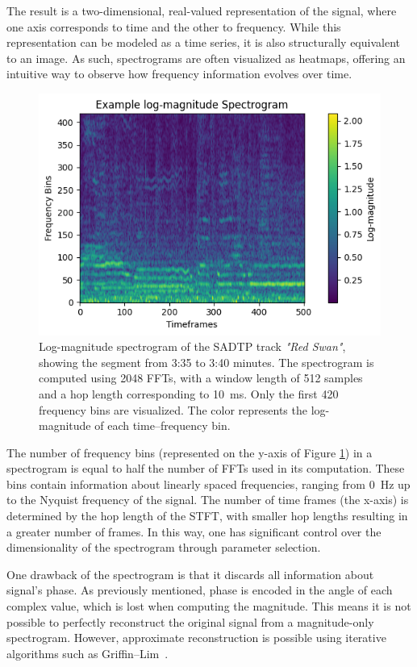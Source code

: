 The result is a two-dimensional, real-valued representation of the signal, where one axis corresponds to time and the other to frequency. While this representation can be modeled as a time series, it is also structurally equivalent to an image. As such, spectrograms are often visualized as heatmaps, offering an intuitive way to observe how frequency information evolves over time.

\begin{figure}[H]
    \centering
    \includegraphics[scale=1.1]{figures/logspectrogram}
    \caption{Log-magnitude spectrogram of the SADTP track \textit{"Red Swan"}, showing the segment from 3:35 to 3:40 minutes. The spectrogram is computed using 2048 \glspl{FFT}, with a window length of 512 samples and a hop length corresponding to 10~ms. Only the first 420 frequency bins are visualized. The color represents the log-magnitude of each time–frequency bin.}
    \label{SpectrogramFigure}
\end{figure}

The number of frequency bins (represented on the y-axis of Figure \ref{SpectrogramFigure}) in a spectrogram is equal to half the number of \glspl{FFT} used in its computation. These bins contain information about linearly spaced frequencies, ranging from 0~Hz up to the Nyquist frequency of the signal. The number of time frames (the x-axis) is determined by the hop length of the \gls{STFT}, with smaller hop lengths resulting in a greater number of frames. In this way, one has significant control over the dimensionality of the spectrogram through parameter selection. 

One drawback of the spectrogram is that it discards all information about signal's phase. As previously mentioned, phase is encoded in the angle of each complex value, which is lost when computing the magnitude. This means it is not possible to perfectly reconstruct the original signal from a magnitude-only spectrogram. However, approximate reconstruction is possible using iterative algorithms such as Griffin–Lim~\cite{1164317}.

